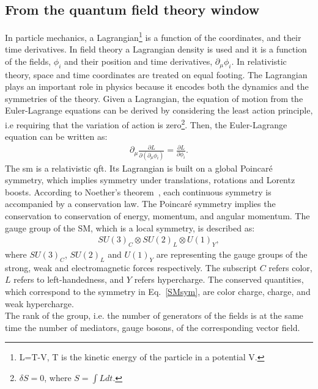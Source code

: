 \subsection{From the quantum field theory window }
\label{sec:StandardModelQFT}
In particle mechanics, a Lagrangian\footnote{L=T-V, T is the kinetic energy of the particle in a potential V.} is a function of the coordinates, and their time derivatives. In field theory a Lagrangian density is used and it is a function of the fields, $\phi_i$ and their position and time derivatives, $\partial_{\mu}\phi_i $. In relativistic theory, space and time coordinates are treated on equal footing. The Lagrangian plays an important role in physics because it encodes both the dynamics and the symmetries of the theory. Given a Lagrangian, the equation of motion from the Euler-Lagrange equations can be derived by considering the least action principle, i.e requiring that the variation of action is zero\footnote{$\delta S=0$, where $S=\int L dt$.}. Then, the Euler-Lagrange equation can be written as:
\begin{eqnarray}
\label{EuLag}
	{ \partial_{\mu}\frac{\partial L}{\partial(\partial_{\mu}\phi_i)}} = {\frac{\partial L}{\partial\phi_i}} .
\end{eqnarray}
The \acrshort{sm} is a relativistic \acrfull{qft}. Its Lagrangian is built on a global Poincar\'{e} symmetry, which implies symmetry under translations, rotations and Lorentz boosts. According to Noether\textquoteright s theorem~\cite{Noether}, each continuous symmetry is accompanied by a conservation law. The Poincar\'{e}‬ symmetry implies the conservation to conservation of energy, momentum, and angular momentum. The gauge group of the SM, which is a local symmetry, is described as:  
\begin{eqnarray}
\label{SMsym}
	{SU(3)_C \otimes SU(2)_L \otimes U(1)_Y},
\end{eqnarray}
where $SU(3)_C$, $SU(2)_L$ and $U(1)_Y$ are representing the gauge groups of the strong, weak and electromagnetic forces respectively. The subscript $C$ refers color, $L$ refers to left-handedness, and $Y$ refers hypercharge. 
The conserved quantities, which correspond to the symmetry in Eq.~\ref{SMsym}, are color charge, charge, and weak hypercharge.\\
The rank of the group, i.e. the number of generators of the fields is at the same time the number of mediators, gauge bosons, of the corresponding vector field.
